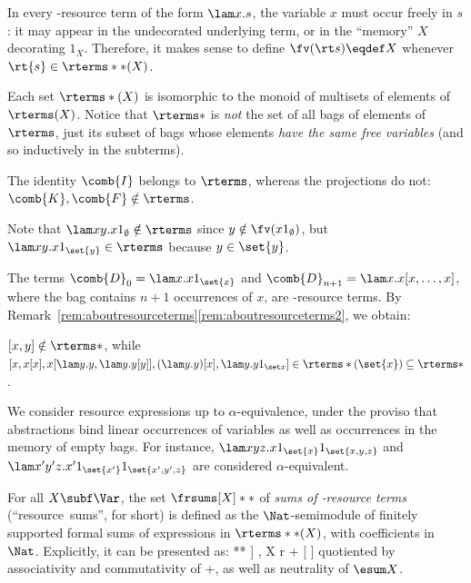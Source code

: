 \Needspace{2cm}
\begin{remark}\label{rem:aboutresourceterms}\mbox{}
\bsub
\item
In every \lamI-resource term of the form $\lam x.s$, the variable $x$ must occur freely in $s$: it may appear in the undecorated underlying term, or in the \enquote{memory} $X$ decorating $1_X$.
Therefore, it makes sense to define $\fv(\rt s) \eqdef X$ whenever $\rt{s} \in \rterms**(X)$.
\item\label{rem:aboutresourceterms2}
Each set $\rterms*(X)$ is isomorphic to the monoid of
multisets of elements of $\rterms(X)$.
Notice that $\rterms*$ is \emph{not} the set of all bags
of elements of $\rterms$, just its subset of bags
whose elements \emph{have the same free variables}
(and so inductively in the subterms).
\esub
\end{remark}

\begin{example}\label{ex:resourceterms}\mbox{}
\bsub
\item The identity $\comb{I}$ belongs to $\rterms$, whereas the projections do not: $\comb{K},\comb{F}\notin\rterms$.
\item Note that $\lam xy.x1_{\emptyset}\notin\rterms$ since $y\notin\fv(x1_{\emptyset})$, but $\lam xy.x1_{\set{y}}\in\rterms$ because $y\in\set{y}$.
\item The terms $\comb{D}_0 = \lam x.x1_{\set{x}}$ and $\comb{D}_{n+1} = \lam x.x[x,\ldots,x]$, where the bag contains $n+1$ occurrences of $x$, are \lamI-resource terms. By Remark~\ref{rem:aboutresourceterms}\eqref{rem:aboutresourceterms2}, we obtain:
\item $[x,y] \notin \rterms*$, while $[x, x[x], x[\lam y.y,\lam y.y[y]], (\lam y.y)[x],  \lam y.y1_{\set x}] \in \rterms*(\set{x})\subseteq\rterms*$.
\esub
\end{example}

We consider resource expressions up to $\alpha$-equivalence, under the proviso that abstractions bind linear occurrences of variables as well as occurrences in the memory of empty bags. For instance, $\lam xyz.x1_{\set{x}}1_{\set{x,y,z}}$ and  $\lam x'y'z.x'1_{\set{x'}}1_{\set{x',y',z}}$ are considered $\alpha$-equivalent. 

\begin{definition}\label{def:frsums}
	For all $X \subf \Var$, the set $\frsums[X]**$
	of \emph{sums of \lamI-resource terms} (\enquote{\mbox{resource sums}}, for short)
	is defined as the $\Nat$-semimodule
	of finitely supported formal sums of expressions in $\rterms**(X)$,
	with coefficients in $\Nat$.
	Explicitly, it can be presented as:
	\bnf[ \frsums[X]** ]{ , }
		{ \esum X \mid \rt r\mid {} +  }
		[  ]
	quotiented by associativity and commutativity of $+$,
	as well as neutrality of $\esum X$.
\end{definition}

